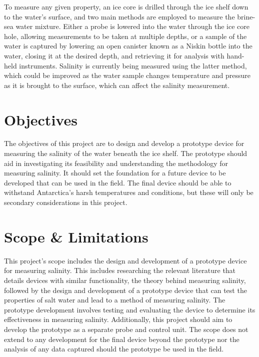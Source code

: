To measure any given property, an ice core is drilled through the ice shelf down to the water's surface, and two main methods are employed to measure the brine-sea water mixture.
Either a probe is lowered into the water through the ice core hole, allowing measurements to be taken at multiple depths, or a sample of the water is captured by lowering an open canister known as a Niskin bottle into the water, closing it at the desired depth, and retrieving it for analysis with hand-held instruments.
Salinity is currently being measured using the latter method, which could be improved as the water sample changes temperature and pressure as it is brought to the surface, which can affect the salinity measurement.

\section{Objectives}

The objectives of this project are to design and develop a prototype device for measuring the salinity of the water beneath the ice shelf.
The prototype should aid in investigating its feasibility and understanding the methodology for measuring salinity.
It should set the foundation for a future device to be developed that can be used in the field.
The final device should be able to withstand Antarctica's harsh temperatures and conditions, but these will only be secondary considerations in this project.


\section{Scope \& Limitations}

This project's scope includes the design and development of a prototype device for measuring salinity.
This includes researching the relevant literature that details devices with similar functionality, the theory behind measuring salinity, followed by the design and development of a prototype device that can test the properties of salt water and lead to a method of measuring salinity.
The prototype development involves testing and evaluating the device to determine its effectiveness in measuring salinity.
Additionally, this project should aim to develop the prototype as a separate probe and control unit.
The scope does not extend to any development for the final device beyond the prototype nor the analysis of any data captured should the prototype be used in the field.

